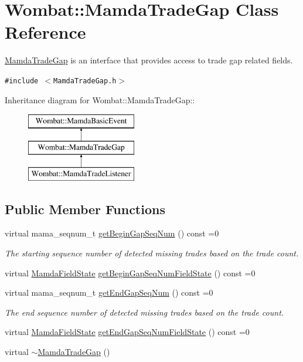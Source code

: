 \hypertarget{classWombat_1_1MamdaTradeGap}{
\section{Wombat::Mamda\-Trade\-Gap Class Reference}
\label{classWombat_1_1MamdaTradeGap}
}
\hyperlink{classWombat_1_1MamdaTradeGap}{Mamda\-Trade\-Gap} is an interface that provides access to trade gap related fields.  


{\tt \#include $<$Mamda\-Trade\-Gap.h$>$}

Inheritance diagram for Wombat::Mamda\-Trade\-Gap::\begin{figure}[H]
\begin{center}
\leavevmode
\includegraphics[height=3cm]{classWombat_1_1MamdaTradeGap}
\end{center}
\end{figure}
\subsection*{Public Member Functions}
\begin{CompactItemize}
\item 
virtual mama\_\-seqnum\_\-t \hyperlink{classWombat_1_1MamdaTradeGap_1b3619649178e414cbee977c9f16d125}{get\-Begin\-Gap\-Seq\-Num} () const =0
\begin{CompactList}\small\item\em The starting sequence number of detected missing trades based on the trade count. \item\end{CompactList}\item 
virtual \hyperlink{namespaceWombat_93aac974f2ab713554fd12a1fa3b7d2a}{Mamda\-Field\-State} \hyperlink{classWombat_1_1MamdaTradeGap_891a25b9fc967b839326754b5cc8010e}{get\-Begin\-Gap\-Seq\-Num\-Field\-State} () const =0
\item 
virtual mama\_\-seqnum\_\-t \hyperlink{classWombat_1_1MamdaTradeGap_585fad255869d86be104a783d14987ca}{get\-End\-Gap\-Seq\-Num} () const =0
\begin{CompactList}\small\item\em The end sequence number of detected missing trades based on the trade count. \item\end{CompactList}\item 
virtual \hyperlink{namespaceWombat_93aac974f2ab713554fd12a1fa3b7d2a}{Mamda\-Field\-State} \hyperlink{classWombat_1_1MamdaTradeGap_9b5d0283e086dd58e28f871c756ddca5}{get\-End\-Gap\-Seq\-Num\-Field\-State} () const =0
\item 
virtual \hyperlink{classWombat_1_1MamdaTradeGap_fd26421b7a89895ebdee612cab74f78e}{$\sim$Mamda\-Trade\-Gap} ()
\end{CompactItemize}


